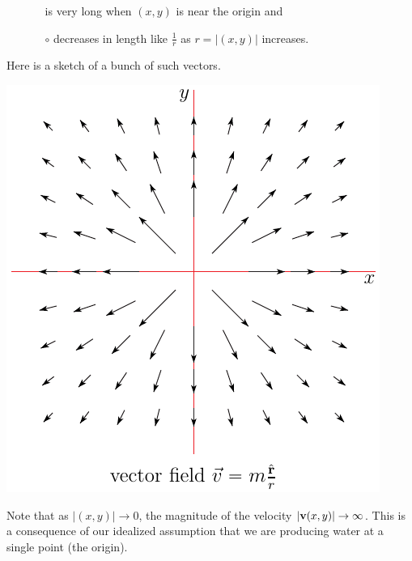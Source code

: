 \begin{eg}
\begin{itemize}
\begin{itemize}
is very long when $(x,y)$ is near the origin and
\item[$\circ$]
decreases in length like $\frac{1}{r}$ as $r=|(x,y)|$ increases.
\end{itemize}
\end{itemize}
Here is a sketch of a bunch of such vectors.
\begin{fig}\label{fig:sourceField}
\begin{center}
    \includegraphics{waterField.pdf}
\end{center}
\end{fig}
\noindent
Note that as $|(x,y)|\rightarrow 0$, the magnitude of the velocity 
$|\mathbf{v}(x,y)|\rightarrow\infty$. This is a consequence of our idealized
assumption that we are producing water at a single point (the origin).
\end{eg}


